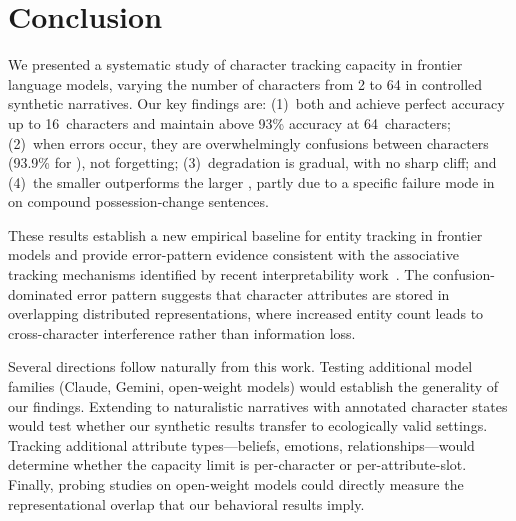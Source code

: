 \section{Conclusion}
\label{sec:conclusion}

We presented a systematic study of character tracking capacity in frontier language models, varying the number of characters from 2 to 64 in controlled synthetic narratives.
Our key findings are: (1)~both \gptfull and \gptmini achieve perfect accuracy up to 16~characters and maintain above 93\% accuracy at 64~characters; (2)~when errors occur, they are overwhelmingly confusions between characters (93.9\% for \gptmini), not forgetting; (3)~degradation is gradual, with no sharp cliff; and (4)~the smaller \gptmini outperforms the larger \gptfull, partly due to a specific failure mode in \gptfull on compound possession-change sentences.

These results establish a new empirical baseline for entity tracking in frontier models and provide error-pattern evidence consistent with the associative tracking mechanisms identified by recent interpretability work~\citep{li2025state}.
The confusion-dominated error pattern suggests that character attributes are stored in overlapping distributed representations, where increased entity count leads to cross-character interference rather than information loss.

Several directions follow naturally from this work.
Testing additional model families (Claude, Gemini, open-weight models) would establish the generality of our findings.
Extending to naturalistic narratives with annotated character states would test whether our synthetic results transfer to ecologically valid settings.
Tracking additional attribute types---beliefs, emotions, relationships---would determine whether the capacity limit is per-character or per-attribute-slot.
Finally, probing studies on open-weight models could directly measure the representational overlap that our behavioral results imply.
